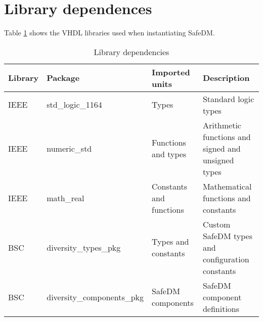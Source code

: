 \section{Library dependences}
Table \ref{dep_tab} shows the VHDL libraries used when instantiating SafeDM.

\begin{table}[H]
	\caption{Library dependencies}
	\label{dep_tab}
	\centering
	\begin{small}
	\begin{tabular}{|l|l|l|p{6cm}|}
		\hline
		\textbf{Library} & \textbf{Package}  & \textbf{Imported units}  & \textbf{Description} \\
		\hline
		IEEE & std\_logic\_1164 & Types & Standard logic types\\
		\hline
		IEEE & numeric\_std & Functions and types & Arithmetic functions and signed and unsigned types\\
		\hline
		IEEE & math\_real & Constants and functions & Mathematical functions and constants\\
		\hline
		BSC & diversity\_types\_pkg & Types and constants & Custom SafeDM types and configuration constants\\
		\hline
		BSC & diversity\_components\_pkg & SafeDM components & SafeDM component definitions\\
		\hline
	\end{tabular}
\end{small}
\end{table}


\hspace{2cm}
